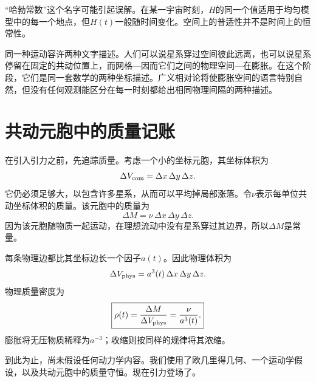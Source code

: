 “哈勃常数”这个名字可能引起误解。在某一宇宙时刻，\(H\)的同一个值适用于均匀模型中的每一个地点，但\(H(t)\)一般随时间变化。空间上的普适性并不是时间上的恒常性。

\begin{classroomqa}
\end{classroomqa}

同一种运动容许两种文字描述。人们可以说星系穿过空间彼此远离，也可以说星系停留在固定的共动位置上，而网格---因而它们之间的物理空间---在膨胀。在这个阶段，它们是同一套数学的两种坐标描述。广义相对论将使膨胀空间的语言特别自然，但没有任何观测能区分在每一时刻都给出相同物理间隔的两种描述。

\section{共动元胞中的质量记账}

在引入引力之前，先追踪质量。考虑一个小的坐标元胞，其坐标体积为
\begin{equation}
\Delta V_{\rm com}=\Delta x\,\Delta y\,\Delta z.
\end{equation}
它仍必须足够大，以包含许多星系，从而可以平均掉局部涨落。令\(\nu\)表示每单位共动坐标体积的质量。该元胞中的质量为
\begin{equation}
\Delta M=\nu\,\Delta x\,\Delta y\,\Delta z.
\label{eq:c01-comoving-mass}
\end{equation}
因为该元胞随物质一起运动，在理想流动中没有星系穿过其边界，所以\(\Delta M\)是常量。

每条物理边都比其坐标边长一个因子\(a(t)\)。因此物理体积为
\begin{equation}
\Delta V_{\rm phys}=a^3(t)\,\Delta x\,\Delta y\,\Delta z.
\end{equation}
物理质量密度为
\begin{equation}
\boxed{\rho(t)=\frac{\Delta M}{\Delta V_{\rm phys}}=\frac{\nu}{a^3(t)}.}
\label{eq:c01-density-dilution}
\end{equation}
膨胀将无压物质稀释为\(a^{-3}\)；收缩则按同样的规律将其浓缩。

到此为止，尚未假设任何动力学内容。我们使用了欧几里得几何、一个运动学假设，以及共动元胞中的质量守恒。现在引力登场了。

